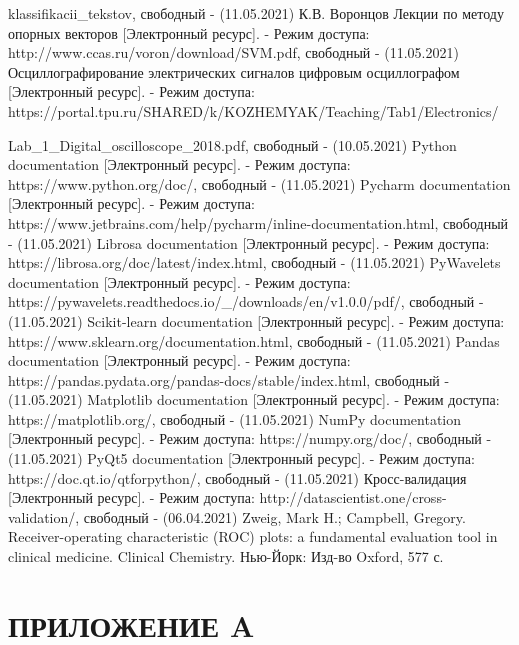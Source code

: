 \documentclass[utf8x, 14pt, oneside, a4paper]{article}
\begin{document}
\begin{thebibliography}{}
		klassifikacii\_tekstov, свободный - (11.05.2021)
		К.В. Воронцов Лекции по методу опорных векторов [Электронный ресурс]. - Режим доступа: http://www.ccas.ru/voron/download/SVM.pdf, свободный - (11.05.2021)
		Осциллографирование электрических сигналов цифровым осциллографом [Электронный ресурс]. - Режим доступа: https://portal.tpu.ru/SHARED/k/KOZHEMYAK/Teaching/Tab1/Electronics/
		
		Lab\_1\_Digital\_oscilloscope\_2018.pdf, свободный - (10.05.2021)
		Python documentation [Электронный ресурс]. - Режим доступа:
		https://www.python.org/doc/, свободный - (11.05.2021)
		Pycharm documentation [Электронный ресурс]. - Режим доступа:
		https://www.jetbrains.com/help/pycharm/inline-documentation.html, свободный - (11.05.2021)
		Librosa documentation [Электронный ресурс]. - Режим доступа:
		https://librosa.org/doc/latest/index.html, свободный - (11.05.2021)
		PyWavelets documentation [Электронный ресурс]. - Режим доступа:
		https://pywavelets.readthedocs.io/\_/downloads/en/v1.0.0/pdf/, свободный - (11.05.2021)
		Scikit-learn documentation [Электронный ресурс]. - Режим доступа:
		https://www.sklearn.org/documentation.html, свободный - (11.05.2021)
		Pandas documentation [Электронный ресурс]. - Режим доступа:
		https://pandas.pydata.org/pandas-docs/stable/index.html, свободный - (11.05.2021)
		Matplotlib documentation [Электронный ресурс]. - Режим доступа:
		https://matplotlib.org/, свободный - (11.05.2021)
		NumPy documentation [Электронный ресурс]. - Режим доступа:
		https://numpy.org/doc/, свободный - (11.05.2021)
		PyQt5 documentation [Электронный ресурс]. - Режим доступа:
		https://doc.qt.io/qtforpython/, свободный - (11.05.2021)
		Кросс-валидация [Электронный ресурс]. - Режим доступа:
		http://datascientist.one/cross-validation/, свободный - (06.04.2021)
		Zweig, Mark H.; Campbell, Gregory. Receiver-operating characteristic (ROC) plots: a fundamental evaluation tool in clinical medicine. Clinical
		Chemistry. Нью-Йорк: Изд-во Oxford, 577 с.
	\end{thebibliography}

	\label{last}
	\pagebreak
	
	\section*{ПРИЛОЖЕНИЕ A}
	
\end{document}

